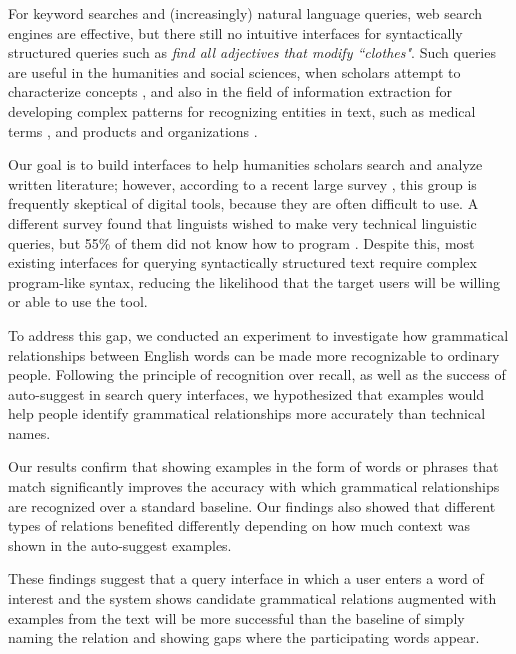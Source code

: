 For keyword searches and (increasingly) natural language queries, web search engines are effective, but there still no intuitive interfaces for   syntactically structured queries such as \emph{ find all adjectives that modify ``clothes"}. Such queries are useful in the humanities and social sciences, when scholars attempt to characterize concepts \cite{muralidharan2013supporting}, and also in the field of information extraction for developing complex patterns for recognizing entities in text, such as medical terms \cite{hirschman2005overview,maclean2013identifying}, and  products and organizations \cite{culotta2005reducing}.

Our goal is to build interfaces to help humanities scholars search and analyze written literature; however, according to a recent large survey \cite{gibbs_building_2012}, this group is frequently skeptical of digital tools, because they are often difficult to use.  A different survey found that  linguists wished to make very technical  linguistic queries, but 55\% of them did not know how to program \cite{soehn2008requirements}. Despite this, most existing interfaces for  querying syntactically structured text require complex program-like syntax, reducing the likelihood that the target users will be willing or able to use the tool.

To address this gap, we conducted an experiment to investigate how grammatical relationships between English words can be made more recognizable to ordinary people. Following the principle of recognition over recall, as well as the success of auto-suggest in search query interfaces, we hypothesized that examples would help people identify grammatical relationships more accurately than technical names.

Our results confirm that showing examples in the form of words or phrases that match significantly improves the accuracy with which grammatical relationships are recognized over a standard baseline.  Our findings also showed that different types of relations benefited differently depending on how much context was shown in the auto-suggest examples.

These findings suggest that a query interface in which a user enters a word of interest and the system shows candidate grammatical relations augmented with examples from the text will be more successful than the baseline of simply naming the relation and showing gaps where the participating words appear.



